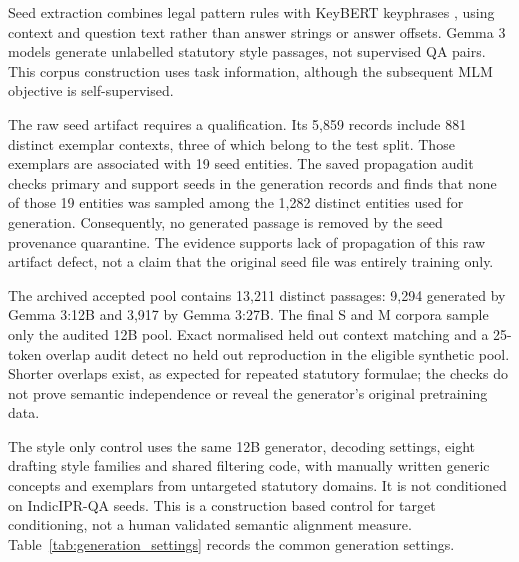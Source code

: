 \documentclass[pdflatex,sn-basic]{sn-jnl}
\begin{document}
Seed extraction combines legal pattern rules with KeyBERT keyphrases
\citep{grootendorst2020keybert}, using context and question text rather than
answer strings or answer offsets. Gemma 3 models \citep{team2025gemma3}
generate unlabelled statutory style passages, not supervised QA pairs.
This corpus construction uses task information, although the subsequent MLM
objective is self-supervised.

The raw seed artifact requires a qualification. Its 5,859 records include
881 distinct exemplar contexts, three of which belong to the test split.
Those exemplars are associated with 19 seed entities. The saved propagation
audit checks primary and support seeds in the generation records and finds
that none of those 19 entities was sampled among the 1,282 distinct entities
used for generation. Consequently, no generated passage is removed by the
seed provenance quarantine. The evidence supports lack of propagation of this
raw artifact defect, not a claim that the original seed file was entirely
training only.

The archived accepted pool contains 13,211 distinct passages: 9,294 generated
by Gemma 3:12B and 3,917 by Gemma 3:27B. The final S and M corpora sample
only the audited 12B pool. Exact normalised held out context matching and
a 25-token overlap audit detect no held out reproduction in the eligible
synthetic pool. Shorter overlaps exist, as expected for repeated statutory
formulae; the checks do not prove semantic independence or reveal the
generator's original pretraining data.

The style only control uses the same 12B generator, decoding settings,
eight drafting style families and shared filtering code, with manually written
generic concepts and exemplars from untargeted statutory domains. It is not
conditioned on IndicIPR-QA seeds. This is a construction based control for
target conditioning, not a human validated semantic alignment measure.
Table~\ref{tab:generation_settings} records the common generation settings.
\end{document}
